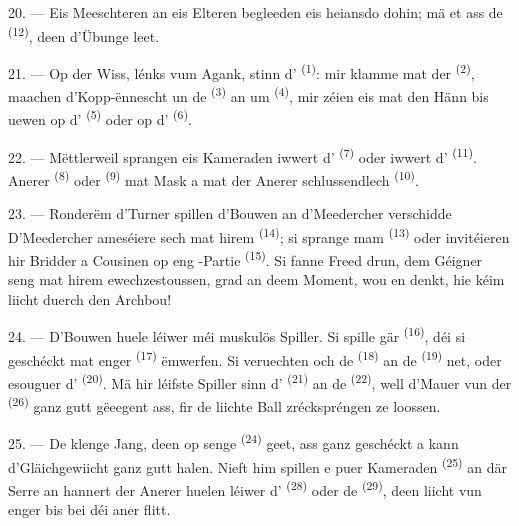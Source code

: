 20. --- Eis Meeschteren an eis Elteren begleeden eis heiansdo dohin; mä et ass de
 \textsuperscript{(12)}, deen d'Übunge leet.

21. --- Op der Wiss, lénks vum Agank, stinn d'
\textsuperscript{(1)}: mir klamme mat der  \textsuperscript{(2)},
maachen d'Kopp-ënnescht un de  \textsuperscript{(3)} an um
 \textsuperscript{(4)}, mir zéien eis mat den Hänn bis uewen op
d' \textsuperscript{(5)} oder op d'
\textsuperscript{(6)}.

22. --- Mëttlerweil sprangen eis Kameraden iwwert d'
\textsuperscript{(7)} oder iwwert d' \textsuperscript{(11)}. Anerer
 \textsuperscript{(8)} oder  \textsuperscript{(9)} mat
Mask a mat der  Anerer schlussendlech 
\textsuperscript{(10)}.

\VUsaut{4.6mm}
\VUsaut{3.0mm}

23. --- Ronderëm d'Turner spillen d'Bouwen an d'Meedercher verschidde
 D'Meedercher ameséiere sech mat hirem 
\textsuperscript{(14)}; si sprange mam  \textsuperscript{(13)} oder
invitéieren hir Bridder a Cousinen op eng -Partie
\textsuperscript{(15)}. Si fanne Freed drun, dem Géigner seng  mat hirem
 ewechzestoussen, grad an deem Moment, wou en denkt, hie kéim
liicht duerch den Archbou!

24. --- D'Bouwen huele léiwer méi muskulös Spiller. Si spille gär 
\textsuperscript{(16)}, déi si geschéckt mat enger  \textsuperscript{(17)}
ëmwerfen. Si veruechten och de  \textsuperscript{(18)} an de
 \textsuperscript{(19)} net, oder esouguer d'
\textsuperscript{(20)}. Mä hir léifste Spiller sinn d'
\textsuperscript{(21)} an de  \textsuperscript{(22)}, well d'Mauer
vun der  \textsuperscript{(26)} ganz gutt gëeegent ass, fir de liichte
Ball zréckspréngen ze loossen.

25. --- De klenge Jang, deen op senge  \textsuperscript{(24)} geet,
ass ganz geschéckt a kann d'Gläichgewiicht ganz gutt halen. Nieft him spillen e puer
Kameraden  \textsuperscript{(25)} an där Serre an hannert der
 Anerer huelen léiwer d' \textsuperscript{(28)} oder de
 \textsuperscript{(29)}, deen liicht vun enger  bis
bei déi aner flitt.

